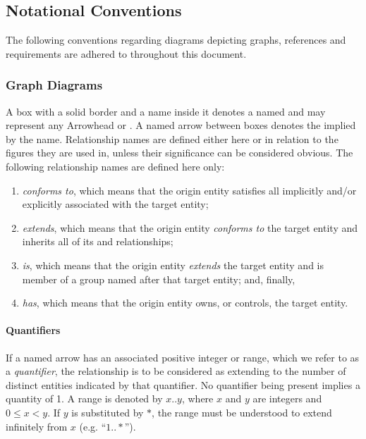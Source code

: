 \newpage

\subsection{Notational Conventions}
\label{sec:introduction:conventions}

The following conventions regarding diagrams depicting graphs, references and requirements are adhered to throughout this document.

\subsubsection{Graph Diagrams}

A box with a solid border and a name inside it denotes a named  and may represent any Arrowhead  or .
A named arrow between boxes denotes the  implied by the name.
Relationship names are defined either here or in relation to the figures they are used in, unless their significance can be considered obvious.
The following relationship names are defined here only:

\begin{enumerate}
\item \textit{conforms to}, which means that the origin entity satisfies all  implicitly and/or explicitly associated with the target entity;
\item \textit{extends}, which means that the origin entity \textit{conforms to} the target entity and inherits all of its  and relationships;
\item \textit{is}, which means that the origin entity \textit{extends} the target entity and is member of a group named after that target entity; and, finally,
\item \textit{has}, which means that the origin entity owns, or controls, the target entity.
\end{enumerate}

\paragraph{Quantifiers}
If a named arrow has an associated positive integer or range, which we refer to as a \textit{quantifier}, the relationship is to be considered as extending to the number of distinct entities indicated by that quantifier.
No quantifier being present implies a quantity of 1.
A range is denoted by $x..y$, where $x$ and $y$ are integers and $0 \leq x < y$.
If $y$ is substituted by $*$, the range must be understood to extend infinitely from $x$ (e.g. ``$1..*$'').

